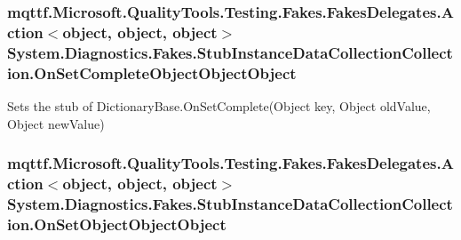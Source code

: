 \hypertarget{class_system_1_1_diagnostics_1_1_fakes_1_1_stub_instance_data_collection_collection_adba3ee99fb8d7cbff73bcd65443b938e}{
\subsubsection[{On\-Set\-Complete\-Object\-Object\-Object}]{\setlength{\rightskip}{0pt plus 5cm}mqttf.\-Microsoft.\-Quality\-Tools.\-Testing.\-Fakes.\-Fakes\-Delegates.\-Action$<$object, object, object$>$ System.\-Diagnostics.\-Fakes.\-Stub\-Instance\-Data\-Collection\-Collection.\-On\-Set\-Complete\-Object\-Object\-Object}}\label{class_system_1_1_diagnostics_1_1_fakes_1_1_stub_instance_data_collection_collection_adba3ee99fb8d7cbff73bcd65443b938e}


Sets the stub of Dictionary\-Base.\-On\-Set\-Complete(\-Object key, Object old\-Value, Object new\-Value)

\hypertarget{class_system_1_1_diagnostics_1_1_fakes_1_1_stub_instance_data_collection_collection_a25fa98423c3f89b231b23cbb487f5958}{
\subsubsection[{On\-Set\-Object\-Object\-Object}]{\setlength{\rightskip}{0pt plus 5cm}mqttf.\-Microsoft.\-Quality\-Tools.\-Testing.\-Fakes.\-Fakes\-Delegates.\-Action$<$object, object, object$>$ System.\-Diagnostics.\-Fakes.\-Stub\-Instance\-Data\-Collection\-Collection.\-On\-Set\-Object\-Object\-Object}}\label{class_system_1_1_diagnostics_1_1_fakes_1_1_stub_instance_data_collection_collection_a25fa98423c3f89b231b23cbb487f5958}


